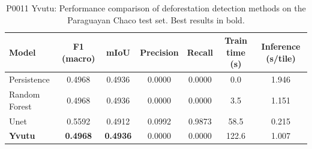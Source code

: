 \begin{table}[h]
\centering
\caption{P0011 Yvutu: Performance comparison of deforestation detection methods on the Paraguayan Chaco test set. Best results in bold.}
\label{tab:main_results}
\begin{tabular}{lcccccc}
\toprule
Model & F1 (macro) & mIoU & Precision & Recall & Train time (s) & Inference (s/tile) \\
\midrule
Persistence & 0.4968 & 0.4936 & 0.0000 & 0.0000 & 0.0 & 1.946 \\
Random Forest & 0.4968 & 0.4936 & 0.0000 & 0.0000 & 3.5 & 1.151 \\
Unet & 0.5592 & 0.4912 & 0.0992 & 0.9873 & 58.5 & 0.215 \\
\textbf{Yvutu} & \textbf{0.4968} & \textbf{0.4936} & 0.0000 & 0.0000 & 122.6 & 1.007 \\
\bottomrule
\end{tabular}
\end{table}